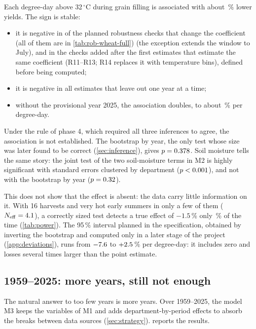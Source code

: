Each degree-day above 32\,$^{\circ}$C during grain filling is associated with about \WheatPct\,\% lower yields. The sign is stable:
\begin{itemize}
  \item it is negative in \WheatRobPreNeg{} of the \WheatRobPreTot{} planned robustness checks that change the coefficient (all of them are in \cref{tab:rob-wheat-full}) (the exception extends the window to July), and in the \WheatRobAddTot{} checks added after the first estimates that estimate the same coefficient (R11--R13; R14 replaces it with temperature bins), defined before being computed;
  \item it is negative in all \LoyoTot{} estimates that leave out one year at a time;
  \item without the provisional year 2025, the association doubles, to about \WheatNoTwentyFivePct\,\% per degree-day.
\end{itemize}

Under the rule of phase 4, which required all three inferences to agree, the association is not established. The bootstrap by year, the only test whose size was later found to be correct (\cref{sec:inference}), gives $p = 0.378$. Soil moisture tells the same story: the joint test of the two soil-moisture terms in M2 is highly significant with standard errors clustered by department ($p <0.001$), and not with the bootstrap by year ($p = 0.32$).

This does not show that the effect is absent: the data carry little information on it. With 16 harvests and very hot early summers in only a few of them ($N_{\mathrm{eff}} = 4.1$), a correctly sized test detects a true effect of $-1.5$\,\% only \WheatPowerWCR\,\% of the time (\cref{tab:power}). The 95\,\% interval planned in the specification, obtained by inverting the bootstrap and computed only in a later stage of the project (\cref{app:deviations}), runs from $-7.6$ to $+2.5$\,\% per degree-day: it includes zero and losses several times larger than the point estimate.

\subsection{1959--2025: more years, still not enough}

The natural answer to too few years is more years. Over 1959--2025, the model M3 keeps the variables of M1 and adds department-by-period effects to absorb the breaks between data sources (\cref{sec:strategy}).  reports the results.

